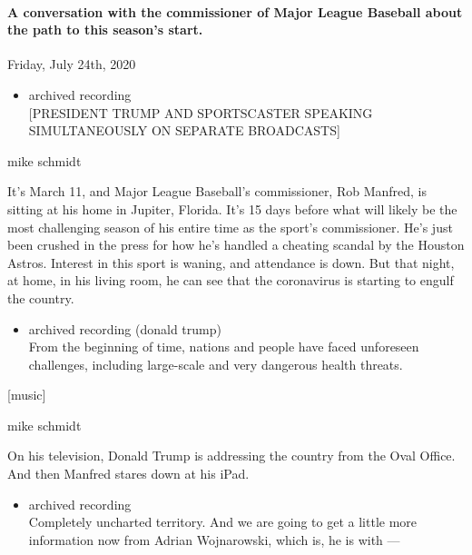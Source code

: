 \hypertarget{a-conversation-with-the-commissioner-of-major-league-baseball-about-the-path-to-this-seasons-start}{%
\paragraph{A conversation with the commissioner of Major League Baseball
about the path to this season's
start.}\label{a-conversation-with-the-commissioner-of-major-league-baseball-about-the-path-to-this-seasons-start}}

Friday, July 24th, 2020

\begin{itemize}
\tightlist
\item
  archived recording\\
  {[}PRESIDENT TRUMP AND SPORTSCASTER SPEAKING SIMULTANEOUSLY ON
  SEPARATE BROADCASTS{]}
\end{itemize}

mike schmidt

It's March 11, and Major League Baseball's commissioner, Rob Manfred, is
sitting at his home in Jupiter, Florida. It's 15 days before what will
likely be the most challenging season of his entire time as the sport's
commissioner. He's just been crushed in the press for how he's handled a
cheating scandal by the Houston Astros. Interest in this sport is
waning, and attendance is down. But that night, at home, in his living
room, he can see that the coronavirus is starting to engulf the country.

\begin{itemize}
\tightlist
\item
  archived recording (donald trump)\\
  From the beginning of time, nations and people have faced unforeseen
  challenges, including large-scale and very dangerous health threats.
\end{itemize}

{[}music{]}

mike schmidt

On his television, Donald Trump is addressing the country from the Oval
Office. And then Manfred stares down at his iPad.

\begin{itemize}
\tightlist
\item
  archived recording\\
  Completely uncharted territory. And we are going to get a little more
  information now from Adrian Wojnarowski, which is, he is with ---
\end{itemize}

